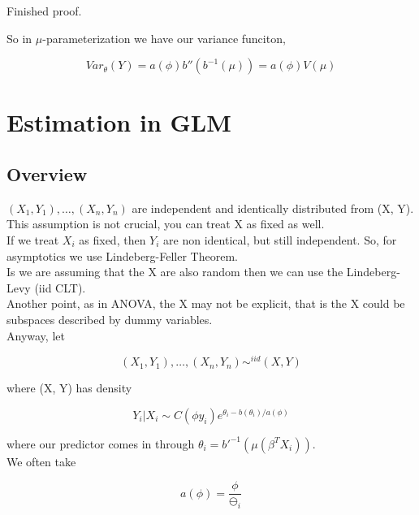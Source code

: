 \documentclass[11pt,fleqn]{book} %
\begin{document}
Finished proof. 

So in $\mu$-parameterization we have our variance funciton, 

		$$Var_\theta(Y) = a(\phi)b''(b^{-1}(\mu)) = a(\phi) V(\mu)$$








 \chapter{Estimation in GLM}

 \section{Overview}



 	$(X_1, Y_1), \dots, (X_n, Y_n) $ are independent and identically distributed from (X, Y). This assumption is not crucial, you can treat X as fixed as well. \\

 	If we treat $X_i$ as fixed, then $Y_i$ are non identical, but still independent. So, for asymptotics we use Lindeberg-Feller Theorem.\\

 	Is we are assuming that the X are also random then we can use the Lindeberg-Levy (iid CLT).\\ 

 	Another point, as in ANOVA, the X may not be explicit, that is the X could be subspaces described by dummy variables.\\

 	Anyway, let

 			$$(X_1, Y_1), \dots, (X_n, Y_n) \sim^{iid} (X, Y) $$

 	where (X, Y) has density

 			$$Y_i|X_i \sim C(\phi y_i) e^{\theta_i - b(\theta_i)/ a(\phi)} $$

 	where our predictor comes in through $\theta_i = b'^{-1}(\mu(\beta^T X_i))$. \\

 	We often take 

 			$$a(\phi) = \frac{\phi}{\ominus_i} $$
\end{document}
